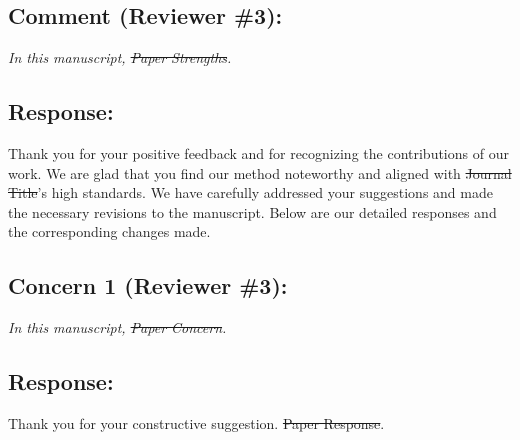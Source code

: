 
{}
\subsection*{Comment (Reviewer \#3):}
\textit{In this manuscript, \sout{Paper Strengths}.}

\subsection*{Response:}
Thank you for your positive feedback and for recognizing the contributions of our work.
We are glad that you find our method noteworthy and aligned with \sout{Journal Title}'s high standards.
We have carefully addressed your suggestions and made the necessary revisions to the manuscript.
Below are our detailed responses and the corresponding changes made.

{}
\subsection*{Concern 1 (Reviewer \#3):}
\textit{In this manuscript, \sout{Paper Concern}.}

\subsection*{Response:}
Thank you for your constructive suggestion.
\sout{Paper Response}.


